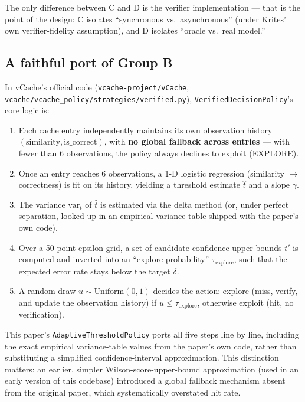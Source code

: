 \documentclass[11pt]{article}
\begin{document}
The only difference between C and D is the verifier implementation --- that is the point of the design: C isolates ``synchronous vs.\ asynchronous'' (under Krites' own verifier-fidelity assumption), and D isolates ``oracle vs.\ real model.''

\subsection{A faithful port of Group B}
\label{sec:groupb}

In vCache's official code (\texttt{vcache-project/\allowbreak{}v\allowbreak{}Cache}, \texttt{vcache/\allowbreak{}vcache\_\allowbreak{}policy/\allowbreak{}strategies/\allowbreak{}verified.\allowbreak{}py}), \texttt{Verified\allowbreak{}Decision\allowbreak{}Policy}'s core logic is:

\begin{enumerate}[leftmargin=*]
  \item Each cache entry independently maintains its own observation history $(\text{similarity}, \text{is\_correct})$, with \textbf{no global fallback across entries} --- with fewer than 6 observations, the policy always declines to exploit (EXPLORE).
  \item Once an entry reaches 6 observations, a 1-D logistic regression (similarity $\rightarrow$ correctness) is fit on its history, yielding a threshold estimate $\hat{t}$ and a slope $\gamma$.
  \item The variance $\text{var}_t$ of $\hat{t}$ is estimated via the delta method (or, under perfect separation, looked up in an empirical variance table shipped with the paper's own code).
  \item Over a 50-point epsilon grid, a set of candidate confidence upper bounds $t'$ is computed and inverted into an ``explore probability'' $\tau_{\text{explore}}$, such that the expected error rate stays below the target $\delta$.
  \item A random draw $u \sim \text{Uniform}(0,1)$ decides the action: explore (miss, verify, and update the observation history) if $u \leq \tau_{\text{explore}}$, otherwise exploit (hit, no verification).
\end{enumerate}

This paper's \texttt{Adaptive\allowbreak{}Threshold\allowbreak{}Policy} ports all five steps line by line, including the exact empirical variance-table values from the paper's own code, rather than substituting a simplified confidence-interval approximation. This distinction matters: an earlier, simpler Wilson-score-upper-bound approximation (used in an early version of this codebase) introduced a global fallback mechanism absent from the original paper, which systematically overstated hit rate.
\end{document}
